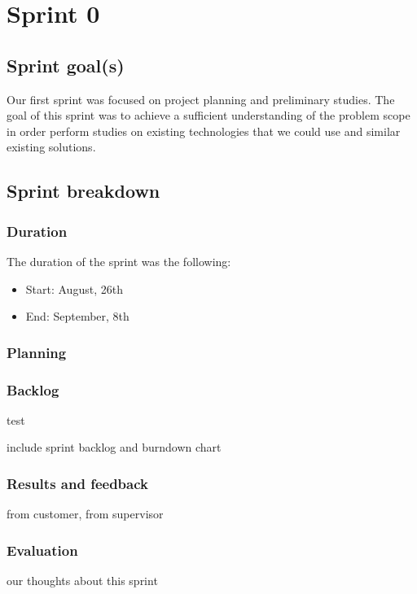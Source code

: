 

\chapter{Sprint 0}
\label{Sprint0}

\section{Sprint goal(s)}

Our first sprint was focused on project planning and preliminary studies.
The goal of this sprint was to achieve a sufficient understanding of the problem scope in order
perform studies on existing technologies that we could use and similar existing solutions.

\section{Sprint breakdown}
\subsection{Duration}
The duration of the sprint was the following:
\begin{itemize}
\item Start: August, 26th
\item End: September, 8th
\end{itemize}

\subsection{Planning} 

\subsection{Backlog}

\begin{description}
\item[test]
\end{description}


include sprint backlog and burndown chart
\subsection{Results and feedback}
from customer, from supervisor
\subsection{Evaluation}
our thoughts about this sprint






